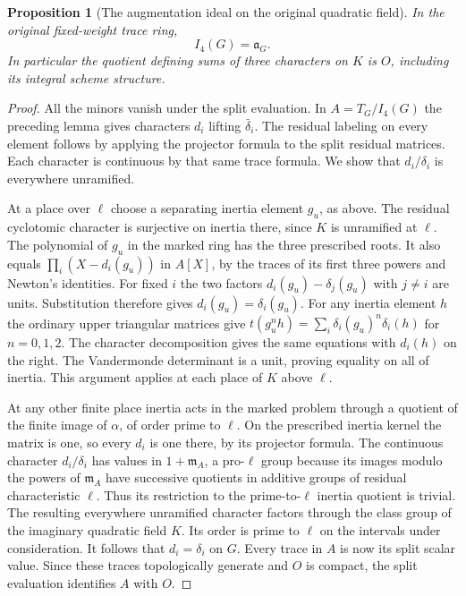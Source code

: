 \documentclass[a4paper,11pt]{article}
\newtheorem{proposition}{Proposition}[section]
\theoremstyle{definition}
\theoremstyle{remark}
\numberwithin{equation}{section}
\begin{document}
\begin{proposition}[The augmentation ideal on the original quadratic field]
\label{prop:origideal373}
In the original fixed-weight trace ring,
\[
                          I_4(G)=\mathfrak a_G .
\]
In particular the quotient defining sums of three characters
on \(K\) is \(O\), including its integral scheme structure.
\end{proposition}
\begin{proof}
All the minors vanish under the split evaluation. In
\(A=T_G/I_4(G)\) the preceding lemma gives characters
\(d_i\) lifting \(\bar\delta_i\). The residual labeling on
every element follows by applying the projector formula to
the split residual matrices. Each character is continuous by
that same trace formula. We show that
\(d_i/\delta_i\) is everywhere unramified.

At a place over \(\ell\) choose a separating inertia element
\(g_u\), as above. The residual cyclotomic character is
surjective on inertia there, since \(K\) is unramified at
\(\ell\). The polynomial of \(g_u\) in the marked ring has
the three prescribed roots. It also equals
\(\prod_i(X-d_i(g_u))\) in \(A[X]\), by the traces of its
first three powers and Newton's identities. For fixed \(i\)
the two factors \(d_i(g_u)-\delta_j(g_u)\) with \(j\ne i\)
are units. Substitution therefore gives
\(d_i(g_u)=\delta_i(g_u)\). For any inertia element \(h\)
the ordinary upper triangular matrices give
\(t(g_u^n h)=\sum_i\delta_i(g_u)^n\delta_i(h)\) for
\(n=0,1,2\). The character decomposition gives the same
equations with \(d_i(h)\) on the right. The Vandermonde
determinant is a unit, proving equality on all of inertia.
This argument applies at each place of \(K\) above \(\ell\).

At any other finite place inertia acts in the marked problem
through a quotient of the finite image of \(\alpha\), of
order prime to \(\ell\). On the prescribed inertia kernel
the matrix is one, so every \(d_i\) is one there, by its
projector formula. The continuous character \(d_i/\delta_i\)
has values in \(1+\mathfrak m_A\), a pro-\(\ell\) group because its images modulo the powers of \(\mathfrak m_A\) have
successive quotients in additive groups of residual
characteristic \(\ell\). Thus its restriction to the
prime-to-\(\ell\) inertia quotient is trivial. The resulting
everywhere unramified character factors through the class
group of the imaginary quadratic field \(K\). Its order is
prime to \(\ell\) on the intervals under consideration.
It follows that \(d_i=\delta_i\) on \(G\). Every trace in
\(A\) is now its split scalar value. Since these traces
topologically generate and \(O\) is compact, the split
evaluation identifies \(A\) with \(O\).
\end{proof}
\end{document}
